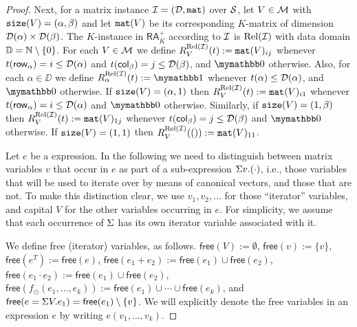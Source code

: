 \begin{proof}
Next, for a matrix instance $\mathcal{I} = (\mathcal{D},\texttt{mat})$ over $\mathcal{S}$,
let $V\in\mathcal{M}$ with $\texttt{size}(V)=(\alpha,\beta)$ and let $\texttt{mat}(V)$ be its corresponding $K$-matrix of dimension $\mathcal{D}(\alpha)\times \mathcal{D}(\beta)$.
The $K$-instance in $\mathsf{RA}_{K}^+$ according to $\mathcal{I}$ is $\text{Rel}(\mathcal{I})$ with data domain $\mathbb{D} = \mathbb{N} \setminus \{0\}$. For each $V\in\mathcal{M}$ we define 
$R_V^{\text{Rel}(\mathcal{I})}(t):=\texttt{mat}(V)_{ij}$ whenever $t(\mathsf{row}_\alpha) = i \leq \mathcal{D}(\alpha)$ and $t(\mathsf{col}_\beta) = j \leq \mathcal{D}(\beta)$, and $\kzero$ otherwise. 
Also, for each $\alpha \in \DD$ we define $R_\alpha^{\text{Rel}(\I)}(t):=\kone$ whenever $t(\alpha) \leq \mathcal{D}(\alpha)$, and $\kzero$ otherwise.
If $\texttt{size}(V)=(\alpha,1)$ then $R_V^{\text{Rel}(\mathcal{I})}(t):=\texttt{mat}(V)_{i1}$ whenever $t(\mathsf{row}_\alpha) = i \leq \mathcal{D}(\alpha)$ and $\kzero$ otherwise.
Similarly, if $\texttt{size}(V)=(1,\beta)$ then $R_V^{\text{Rel}(\mathcal{I})}(t):=\texttt{mat}(V)_{1j}$ whenever $t(\mathsf{col}_\beta) = j \leq \mathcal{D}(\beta)$ and $\kzero$ otherwise.
If $\texttt{size}(V)=(1,1)$ then $R_V^{\text{Rel}(\mathcal{I})}(()):=\texttt{mat}(V)_{11}$.


Let $e$ be a \langsum expression. In the following we need to distinguish between matrix variables $v$
that occur in $e$ as part of a sub-expression $\Sigma v. (\cdot)$, i.e., those variables that will be used to iterate over by means of canonical vectors, and those that are not. To make this distinction clear, we use $v_1,v_2,\ldots$ for those ``iterator'' variables, and capital $V$ for the other variables occurring in $e$. For simplicity, we assume that each occurrence of $\Sigma$ has its own iterator variable associated with it. 

We define free (iterator) variables, as follows.
$\mathsf{free}(V):=\emptyset$, $\mathsf{free}(v):=\{v\}$, $\mathsf{free}(e^T):=\mathsf{free}(e)$, $\mathsf{free}(e_1+e_2):=\mathsf{free}(e_1)\cup \mathsf{free}(e_2)$, $\mathsf{free}(e_1\cdot e_2):=\mathsf{free}(e_1)\cup \mathsf{free}(e_2)$,
 $\mathsf{free}(f_\odot(e_1,\ldots,e_k)):=\mathsf{free}(e_1)\cup\cdots \cup \mathsf{free}(e_k)$, and $\mathsf{free}(e=\Sigma V. e_1)=\mathsf{free}(e_1)\setminus\{v\}$. We will explicitly denote the free variables in an expression $e$ by writing $e(v_1,\ldots,v_k)$.


\end{proof}
